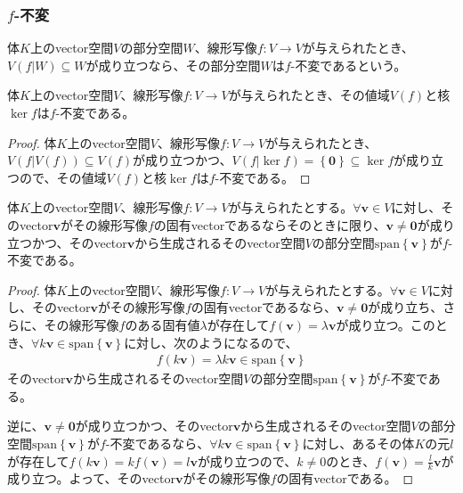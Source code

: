 \documentclass[dvipdfmx]{jsarticle}
\begin{document}
\subsubsection{$f$-不変}%
\begin{dfn}\label{f-不変の定義}
体$K$上のvector空間$V$の部分空間$W$、線形写像$f:V \rightarrow V$が与えられたとき、$V\left( f|W \right) \subseteq W$が成り立つなら、その部分空間$W$は$f$-不変であるという。
\end{dfn}
\begin{thm}
\label{2.2.4.8}
体$K$上のvector空間$V$、線形写像$f:V \rightarrow V$が与えられたとき、その値域$V(f)$と核$\ker f$は$f$-不変である。
\end{thm}
\begin{proof}
体$K$上のvector空間$V$、線形写像$f:V \rightarrow V$が与えられたとき、$V\left( f|V(f) \right) \subseteq V(f)$が成り立つかつ、$V\left( f|\ker f \right) = \left\{ \mathbf{0} \right\} \subseteq \ker f$が成り立つので、その値域$V(f)$と核$\ker f$は$f$-不変である。
\end{proof}
\begin{thm}
\label{2.2.4.9}
体$K$上のvector空間$V$、線形写像$f:V \rightarrow V$が与えられたとする。$\forall\mathbf{v} \in V$に対し、そのvector$\mathbf{v}$がその線形写像$f$の固有vectorであるならそのときに限り、$\mathbf{v} \neq \mathbf{0}$が成り立つかつ、そのvector$\mathbf{v}$から生成されるそのvector空間$V$の部分空間${\mathrm{span}}\left\{ \mathbf{v} \right\}$が$f$-不変である。
\end{thm}
\begin{proof}
体$K$上のvector空間$V$、線形写像$f:V \rightarrow V$が与えられたとする。$\forall\mathbf{v} \in V$に対し、そのvector$\mathbf{v}$がその線形写像$f$の固有vectorであるなら、$\mathbf{v} \neq \mathbf{0}$が成り立ち、さらに、その線形写像$f$のある固有値$\lambda$が存在して$f\left( \mathbf{v} \right) = \lambda\mathbf{v}$が成り立つ。このとき、$\forall k\mathbf{v} \in {\mathrm{span}}\left\{ \mathbf{v} \right\}$に対し、次のようになるので、
\begin{align*}
f\left( k\mathbf{v} \right) = \lambda k\mathbf{v} \in {\mathrm{span}}\left\{ \mathbf{v} \right\}
\end{align*}
そのvector$\mathbf{v}$から生成されるそのvector空間$V$の部分空間${\mathrm{span}}\left\{ \mathbf{v} \right\}$が$f$-不変である。\par
逆に、$\mathbf{v} \neq \mathbf{0}$が成り立つかつ、そのvector$\mathbf{v}$から生成されるそのvector空間$V$の部分空間${\mathrm{span}}\left\{ \mathbf{v} \right\}$が$f$-不変であるなら、$\forall k\mathbf{v} \in {\mathrm{span}}\left\{ \mathbf{v} \right\}$に対し、あるその体$K$の元$l$が存在して$f\left( k\mathbf{v} \right) = kf\left( \mathbf{v} \right) = l\mathbf{v}$が成り立つので、$k \neq 0$のとき、$f\left( \mathbf{v} \right) = \frac{l}{k}\mathbf{v}$が成り立つ。よって、そのvector$\mathbf{v}$がその線形写像$f$の固有vectorである。
\end{proof}
\end{document}
